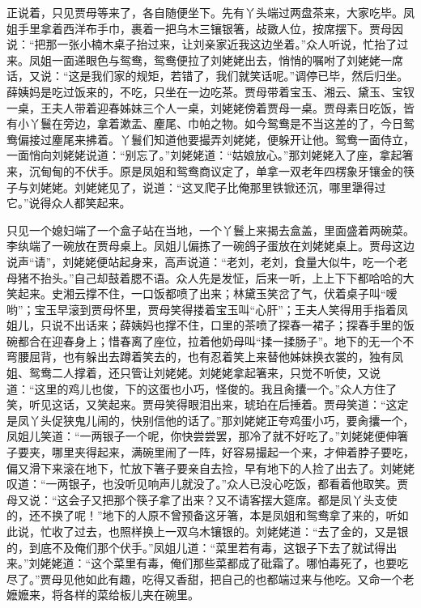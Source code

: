 \documentclass[12pt,oneside]{book}
\begin{document}
正说着，只见贾母等来了，各自随便坐下。先有丫头端过两盘茶来，大家吃毕。凤姐手里拿着西洋布手巾，裹着一把乌木三镶银箸，敁敪人位，按席摆下。贾母因说：“把那一张小楠木桌子抬过来，让刘亲家近我这边坐着。”众人听说，忙抬了过来。凤姐一面递眼色与鸳鸯，鸳鸯便拉了刘姥姥出去，悄悄的嘱咐了刘姥姥一席话，又说：“这是我们家的规矩，若错了，我们就笑话呢。”调停已毕，然后归坐。薛姨妈是吃过饭来的，不吃，只坐在一边吃茶。贾母带着宝玉、湘云、黛玉、宝钗一桌，王夫人带着迎春姊妹三个人一桌，刘姥姥傍着贾母一桌。贾母素日吃饭，皆有小丫鬟在旁边，拿着漱盂、麈尾、巾帕之物。如今鸳鸯是不当这差的了，今日鸳鸯偏接过麈尾来拂着。丫鬟们知道他要撮弄刘姥姥，便躲开让他。鸳鸯一面侍立，一面悄向刘姥姥说道：“别忘了。”刘姥姥道：“姑娘放心。”那刘姥姥入了座，拿起箸来，沉甸甸的不伏手。原是凤姐和鸳鸯商议定了，单拿一双老年四楞象牙镶金的筷子与刘姥姥。刘姥姥见了，说道：“这叉爬子比俺那里铁锨还沉，哪里犟得过它。”说得众人都笑起来。

只见一个媳妇端了一个盒子站在当地，一个丫鬟上来揭去盒盖，里面盛着两碗菜。李纨端了一碗放在贾母桌上。凤姐儿偏拣了一碗鸽子蛋放在刘姥姥桌上。贾母这边说声“请”，刘姥姥便站起身来，高声说道：“老刘，老刘，食量大似牛，吃一个老母猪不抬头。”自己却鼓着腮不语。众人先是发怔，后来一听，上上下下都哈哈的大笑起来。史湘云撑不住，一口饭都喷了出来；林黛玉笑岔了气，伏着桌子叫“嗳哟”；宝玉早滚到贾母怀里，贾母笑得搂着宝玉叫“心肝”；王夫人笑得用手指着凤姐儿，只说不出话来；薛姨妈也撑不住，口里的茶喷了探春一裙子；探春手里的饭碗都合在迎春身上；惜春离了座位，拉着他奶母叫“揉一揉肠子”。地下的无一个不弯腰屈背，也有躲出去蹲着笑去的，也有忍着笑上来替他姊妹换衣裳的，独有凤姐、鸳鸯二人撑着，还只管让刘姥姥。刘姥姥拿起箸来，只觉不听使，又说道：“这里的鸡儿也俊，下的这蛋也小巧，怪俊的。我且肏攮一个。”众人方住了笑，听见这话，又笑起来。贾母笑得眼泪出来，琥珀在后捶着。贾母笑道：“这定是凤丫头促狭鬼儿闹的，快别信他的话了。”那刘姥姥正夸鸡蛋小巧，要肏攮一个，凤姐儿笑道：“一两银子一个呢，你快尝尝罢，那冷了就不好吃了。”刘姥姥便伸箸子要夹，哪里夹得起来，满碗里闹了一阵，好容易撮起一个来，才伸着脖子要吃，偏又滑下来滚在地下，忙放下箸子要亲自去捡，早有地下的人捡了出去了。刘姥姥叹道：“一两银子，也没听见响声儿就没了。”众人已没心吃饭，都看着他取笑。贾母又说：“这会子又把那个筷子拿了出来？又不请客摆大筵席。都是凤丫头支使的，还不换了呢！”地下的人原不曾预备这牙箸，本是凤姐和鸳鸯拿了来的，听如此说，忙收了过去，也照样换上一双乌木镶银的。刘姥姥道：“去了金的，又是银的，到底不及俺们那个伏手。”凤姐儿道：“菜里若有毒，这银子下去了就试得出来。”刘姥姥道：“这个菜里有毒，俺们那些菜都成了砒霜了。哪怕毒死了，也要吃尽了。”贾母见他如此有趣，吃得又香甜，把自己的也都端过来与他吃。又命一个老嬷嬷来，将各样的菜给板儿夹在碗里。
\end{document}
